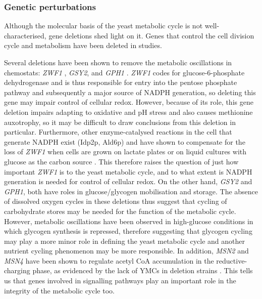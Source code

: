 \subsubsection{Genetic perturbations}
\label{subsubsec:intro-ymc-perturbations-genetic}

Although the molecular basis of the yeast metabolic cycle is not well-characterised, gene deletions shed light on it.
Genes that control the cell division cycle and metabolism have been deleted in studies.

Several deletions have been shown to remove the metabolic oscillations in chemostats: \emph{ZWF1} \citep{tuCyclicChangesMetabolic2007}, \emph{GSY2}, and \emph{GPH1} \parencite{oneillEukaryoticCellBiology2020}.
\emph{ZWF1} codes for glucose-6-phosphate dehydrogenase and is thus responsible for entry into the pentose phosphate pathway and subsequently a major source of NADPH generation, so deleting this gene may impair control of cellular redox.
However, because of its role, this gene deletion impairs adapting to oxidative and pH stress and also causes methionine auxotrophy, so it may be difficult to draw conclusions from this deletion in particular.
Furthermore, other enzyme-catalysed reactions in the cell that generate NADPH exist (Idp2p, Ald6p) and have shown to compensate for the loss of \emph{ZWF1} when cells are grown on lactate plates or on liquid cultures with glucose as the carbon source \parencite{minardSourcesNADPHYeast2005}.
This therefore raises the question of just how important \emph{ZWF1} is to the yeast metabolic cycle, and to what extent is NADPH generation is needed for control of cellular redox.
On the other hand, \emph{GSY2} and \emph{GPH1}, both have roles in glucose/glycogen mobilisation and storage.
The absence of dissolved oxygen cycles in these deletions thus suggest that cycling of carbohydrate stores may be needed for the function of the metabolic cycle.
However, metabolic oscillations have been observed in high-glucose conditions \parencite{papagiannakisAutonomousMetabolicOscillations2017, baumgartnerFlavinbasedMetabolicCycles2018} in which glycogen synthesis is repressed, therefore suggesting that glycogen cycling may play a more minor role in defining the yeast metabolic cycle and another nutrient cycling phenomenon may be more responsible.
In addition, \emph{MSN2} and \emph{MSN4} have been shown to regulate acetyl CoA accumulation in the reductive-charging phase, as evidenced by the lack of YMCs in deletion strains \citep{kuangMsn2RegulateExpression2017}.
This tells us that genes involved in signalling pathways play an important role in the integrity of the metabolic cycle too.

